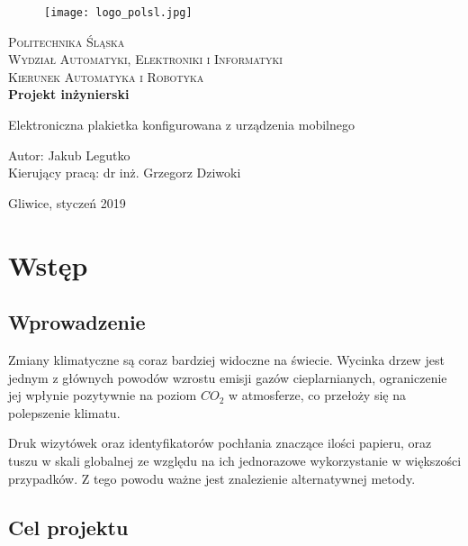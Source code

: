\documentclass[a4paper,12pt, twoside]{article}
\begin{document}
	\newpage
	\thispagestyle{empty}
	\begin{center}
		
		\begin{figure}
			\centering
			\texttt{[image: logo\_polsl.jpg]}
			\vspace{.5cm}
		\end{figure}
		
		{\fontsize{17}{17}\selectfont
			\textsc{Politechnika Śląska \\[.3cm]
				Wydział Automatyki, Elektroniki i Informatyki  \\[.3cm]
				Kierunek Automatyka i Robotyka  \\[1.5cm]}
			\textbf{Projekt inżynierski \\[0.7cm]}}
		
		\Large
		{Elektroniczna plakietka konfigurowana z urządzenia mobilnego \\[4cm]}
		\Large{\begin{flushleft}
				Autor: Jakub Legutko\\
				Kierujący pracą: dr inż. Grzegorz Dziwoki\\[0.3cm]
		\end{flushleft}}
		
		\normalsize
		\vfill Gliwice, styczeń 2019
	\end{center}
	\newpage
	\newpage
	\thispagestyle{empty}
	\tableofcontents
	\newpage
	\newpage
	\clearpage
	\setcounter{page}{1}
	\section{Wstęp}
	
	\subsection{Wprowadzenie}
	Zmiany klimatyczne są coraz bardziej widoczne na świecie. Wycinka drzew jest jednym z głównych powodów wzrostu emisji gazów cieplarnianych\cite{clima_causes}, ograniczenie jej wpłynie pozytywnie na poziom ${CO_{2}}$ w atmosferze, co przełoży się na polepszenie klimatu. 
	
	Druk wizytówek oraz identyfikatorów pochłania znaczące ilości papieru, oraz tuszu w skali globalnej ze względu na ich jednorazowe wykorzystanie w większości przypadków. Z tego powodu ważne jest znalezienie alternatywnej metody. 
	
	
	\subsection{Cel projektu}
	
\end{document}
